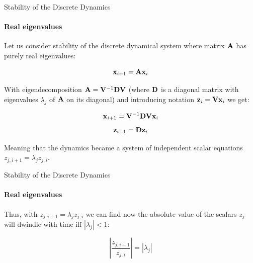 \documentclass{beamer}
\begin{document}
\begin{frame}{Stability of the Discrete Dynamics}
	\framesubtitle{Real eigenvalues}
	\begin{flushleft}
		
		Let us consider stability of the discrete dynamical system where matrix $\mathbf{A}$ has purely real eigenvalues:
		
		\begin{equation}
			\mathbf{x}_{i+1} = \mathbf{A}\mathbf{x}_i
		\end{equation}		
		
		With eigendecomposition $\mathbf{A} = \mathbf{V}^{-1} \mathbf{D} \mathbf{V}$ (where $\mathbf{D}$ is a diagonal matrix with eigenvalues $\lambda_j$ of $\mathbf{A}$ on its diagonal)  and introducing notation $\mathbf{z}_i = \mathbf{V}\mathbf{x}_i$ we get:
		
		\begin{equation}
			\mathbf{x}_{i+1} = \mathbf{V}^{-1} \mathbf{D} \mathbf{V}\mathbf{x}_i
		\end{equation}
		\begin{equation}
			\mathbf{z}_{i+1} =  \mathbf{D} \mathbf{z}_i
		\end{equation}
		
		Meaning that the dynamics became a system of independent scalar equations $z_{j, i+1} =  \lambda_j z_{j, i}$. 
		
		
	\end{flushleft}
\end{frame}




\begin{frame}{Stability of the Discrete Dynamics}
	\framesubtitle{Real eigenvalues}
	\begin{flushleft}
		
		Thus, with $z_{j, i+1} =  \lambda_j z_{j, i}$ we can find now the absolute value of the scalars $z_{j}$ will dwindle with time iff $|\lambda_j| < 1$:
		
		\begin{equation}
			\left| \frac{z_{j, i+1}}{z_{j, i}} \right | =   | \lambda_j |
		\end{equation}
		 
		
	\end{flushleft}
\end{frame}
\end{document}
